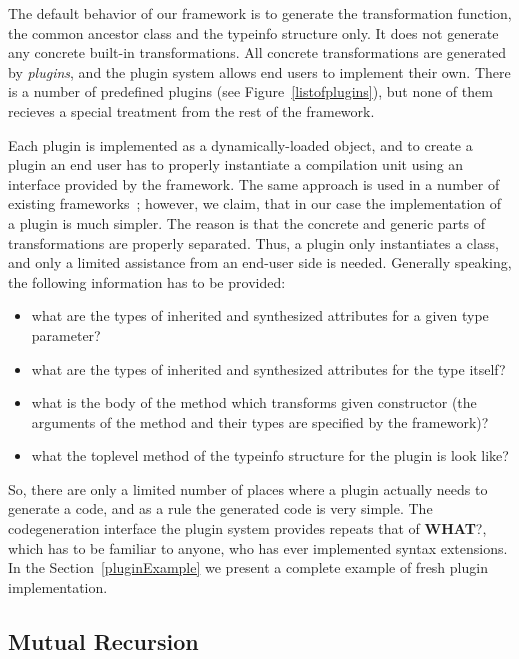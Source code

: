 The default behavior of our framework is to generate the transformation function, the common ancestor class and the typeinfo structure only. It does not
generate any concrete built-in transformations. All concrete transformations are generated by \emph{plugins}, and the plugin system allows end users to
implement their own. There is a number of predefined plugins (see Figure~\ref{listofplugins}), but none of them recieves a special treatment from the
rest of the framework.

Each plugin is implemented as a dynamically-loaded object, and to create a plugin an end user has to properly instantiate a compilation unit using an interface
provided by the framework. The same approach is used in a number of existing frameworks~\cite{PPXLib,Yallop}; however, we claim, that in our case the
implementation of a plugin is much simpler. The reason is that the concrete and generic parts of transformations are properly separated. Thus,
a plugin only instantiates a class, and only a limited assistance from an end-user side is needed. Generally speaking, the following information has to be
provided:

\begin{itemize}
\item what are the types of inherited and synthesized attributes for a given type parameter?
\item what are the types of inherited and synthesized attributes for the type itself?
\item what is the body of the method which transforms given constructor (the arguments of the method and their types are specified by the framework)?
\item what the toplevel method of the typeinfo structure for the plugin is look like?
\end{itemize}

So, there are only a limited number of places where a plugin actually needs to generate a code, and as a rule the generated code is very simple. The
codegeneration interface the plugin system provides repeats that of \textbf{WHAT}?, which has to be familiar to anyone, who has ever implemented
syntax extensions. In the Section~\ref{pluginExample} we present a complete example of fresh plugin implementation.

\subsection{Mutual Recursion}
\label{murec}

